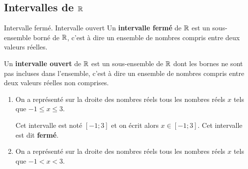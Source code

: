 \begin{pageCours} %


\section{Intervalles de $\mathbb R$ }

\begin{DefT}{Intervalle fermé. Intervalle ouvert}
Un \textbf{intervalle fermé} de $\mathbb R$ est un sous-ensemble borné de $\mathbb R$, c'est à dire un ensemble de nombres compris entre deux valeurs réelles.
 
Un \textbf{intervalle ouvert} de $\mathbb R$ est un sous-ensemble de $\mathbb R$ dont les bornes ne sont pas incluses dans l'ensemble, c'est à dire un ensemble de nombres compris entre deux valeurs réelles non comprises.
\end{DefT}

\begin{Rep}
\begin{enumerate}
\item On a représenté sur la droite des nombres réels tous les nombres réels $x$ tels que $-1 \leq x \leq 3$.

\begin{center}
 \end{center} 
 
Cet intervalle est noté $[-1;3]$ et on écrit alors $x \in [-1;3]$. Cet intervalle est dit \textbf{fermé}.
 \item On a représenté sur la droite des nombres réels tous les nombres réels $x$ tels que $-1 < x < 3$.


\end{enumerate}
\end{Rep}
\end{pageCours}
